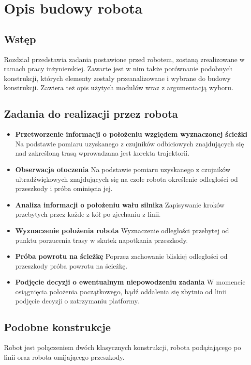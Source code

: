 \chapter{Opis budowy robota}
\section{Wstęp}
Rozdział przedstawia zadania postawione przed robotem, zostaną zrealizowane w ramach pracy inżynierskiej. Zawarte jest w nim także porównanie podobnych konstrukcji, których elementy zostały przeanalizowane i wybrane do budowy konstrukcji. Zawiera też opis użytych modułów wraz z argumentacją wyboru.
\section{Zadania do realizacji przez robota}
\begin{itemize}
    \item \textbf{Przetworzenie informacji o położeniu względem wyznaczonej ścieżki}
    Na podstawie pomiaru uzyskanego z czujników odbiciowych znajdujących się nad zakreśloną trasą wprowadzana jest korekta trajektorii.
    \item \textbf{Obserwacja otoczenia}
    Na podstawie pomiaru uzyskanego z czujników ultradźwiękowych znajdujących się na czole robota określenie odległości od przeszkody i próba ominięcia jej.
    \item \textbf{Analiza informacji o położeniu wału silnika}
    Zapisywanie kroków przebytych przez każde z kół po zjechaniu z linii.
    \item \textbf{Wyznaczenie położenia robota}
    Wyznaczenie odległości przebytej od punktu porzucenia trasy w skutek napotkania przeszkody.
    \item \textbf{Próba powrotu na ścieżkę }
    Poprzez zachowanie bliskiej odległości od przeszkody próba powrotu na ścieżkę.
    \item \textbf{Podjęcie decyzji o ewentualnym niepowodzeniu zadania}
    W momencie osiągnięcia położenia początkowego, bądź oddalenia się zbytnio od linii podjęcie decyzji o zatrzymaniu platformy.
\end{itemize}

\section{Podobne konstrukcje}
Robot jest połączeniem dwóch klasycznych konstrukcji, robota podążającego po linii oraz robota omijającego przeszkody.

